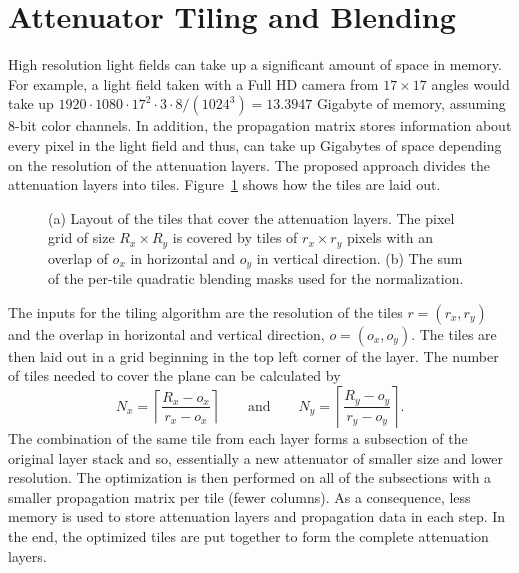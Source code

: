 \section{Attenuator Tiling and Blending}
\label{sec:tiling_and_blending}

High resolution light fields can take up a significant amount of space in memory. 
For example, a light field taken with a Full HD camera from $17 \times 17$ angles would take up $1920 \cdot 1080 \cdot 17^2 \cdot 3 \cdot 8 / (1024^3) = 13.3947$ Gigabyte of memory, assuming \mbox{8-bit} color channels. 
In addition, the propagation matrix stores information about every pixel in the light field and thus, can take up Gigabytes of space depending on the resolution of the attenuation layers. 
The proposed approach divides the attenuation layers into tiles. 
Figure~\ref{fig:tiling_layout} shows how the tiles are laid out.
\begin{figure}[tb]
	\begin{subfigure}{0.5\textwidth}
		\centering
		
		\caption{}
		\label{fig:tiling_layout}
	\end{subfigure}%
	\begin{subfigure}{0.5\textwidth}
		\centering
		
		\caption{}
		\label{fig:sum_of_quadratic_blending_masks}
	\end{subfigure}%
	\caption[Tiling layout]
			{(a) Layout of the tiles that cover the attenuation layers.
				 The pixel grid of size $R_x \times R_y$ is covered by tiles of $r_x \times r_y$ pixels with an overlap of $o_x$ in horizontal and $o_y$ in vertical direction.
			 (b) The sum of the per-tile quadratic blending masks used for the normalization.}
\end{figure}
The inputs for the tiling algorithm are the resolution of the tiles $r = (r_x, r_y)$ and the overlap in horizontal and vertical direction, $o = (o_x, o_y)$. 
The tiles are then laid out in a grid beginning in the top left corner of the layer. 
The number of tiles needed to cover the plane can be calculated by 
\begin{equation}
	N_x = \left \lceil \dfrac{R_x - o_x}{r_x - o_x} \right \rceil
	\qquad 
	\text{and} 
	\qquad
	N_y = \left \lceil \dfrac{R_y - o_y}{r_y - o_y} \right \rceil.
\end{equation}
The combination of the same tile from each layer forms a subsection of the original layer stack and so, essentially a new attenuator of smaller size and lower resolution.
The optimization is then performed on all of the subsections with a smaller propagation matrix per tile (fewer columns). 
As a consequence, less memory is used to store attenuation layers and propagation data in each step.
In the end, the optimized tiles are put together to form the complete attenuation layers. 

